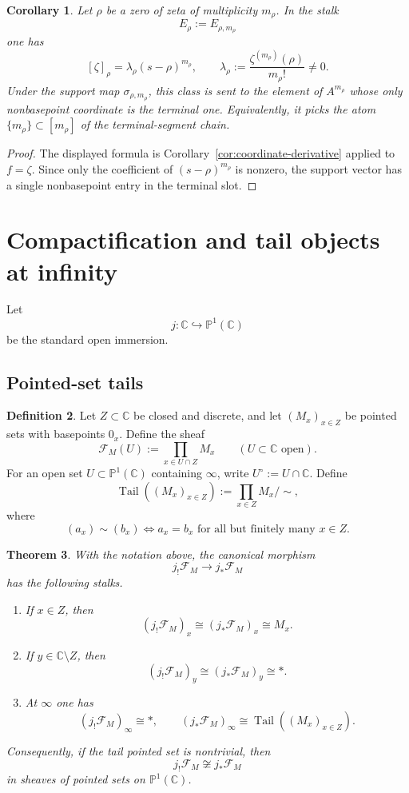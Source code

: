 \documentclass[11pt,a4paper]{article}
\newtheorem{theorem}{Theorem}[section]
\newtheorem{corollary}[theorem]{Corollary}
\theoremstyle{definition}
\newtheorem{definition}[theorem]{Definition}
\theoremstyle{remark}
\DeclareMathOperator{\Tail}{Tail}
\newcommand{\CC}{\mathbb C}
\newcommand{\PP}{\mathbb P}
\newcommand{\into}{\hookrightarrow}
\begin{document}
\begin{corollary}\label{cor:zeta-support-slot}
Let $\rho$ be a zero of zeta of multiplicity $m_\rho$.  In the stalk
\[
E_\rho:=E_{\rho,m_\rho}
\]
one has
\[
[\zeta]_\rho=\lambda_\rho (s-\rho)^{m_\rho},
\qquad
\lambda_\rho:=\frac{\zeta^{(m_\rho)}(\rho)}{m_\rho!}\neq0.
\]
Under the support map $\sigma_{\rho,m_\rho}$, this class is sent to the element of $A^{m_\rho}$ whose only nonbasepoint coordinate is the terminal one.  Equivalently, it picks the atom $\{m_\rho\}\subset [m_\rho]$ of the terminal-segment chain.
\end{corollary}

\begin{proof}
The displayed formula is Corollary~\ref{cor:coordinate-derivative} applied to $f=\zeta$.  Since only the coefficient of $(s-\rho)^{m_\rho}$ is nonzero, the support vector has a single nonbasepoint entry in the terminal slot.
\end{proof}

\section{Compactification and tail objects at infinity}

Let
\[
j:\CC\into\PP^1(\CC)
\]
be the standard open immersion.

\subsection{Pointed-set tails}

\begin{definition}
Let $Z\subset\CC$ be closed and discrete, and let $(M_x)_{x\in Z}$ be pointed sets with basepoints $0_x$.  Define the sheaf
\[
\mathcal F_M(U):=\prod_{x\in U\cap Z}M_x
\qquad (U\subset\CC\text{ open}).
\]
For an open set $U\subset\PP^1(\CC)$ containing $\infty$, write $U^\circ:=U\cap\CC$.  Define
\[
\Tail((M_x)_{x\in Z}):=\prod_{x\in Z}M_x\Big/\sim,
\]
where
\[
(a_x)\sim(b_x)\iff a_x=b_x\text{ for all but finitely many }x\in Z.
\]
\end{definition}

\begin{theorem}\label{thm:stalks-at-infty}
With the notation above, the canonical morphism
\[
j_!\mathcal F_M\longrightarrow j_*\mathcal F_M
\]
has the following stalks.
\begin{enumerate}[label=(\roman*)]
\item If $x\in Z$, then
\[
(j_!\mathcal F_M)_x\cong (j_*\mathcal F_M)_x\cong M_x.
\]
\item If $y\in\CC\setminus Z$, then
\[
(j_!\mathcal F_M)_y\cong (j_*\mathcal F_M)_y\cong *.
\]
\item At $\infty$ one has
\[
(j_!\mathcal F_M)_\infty\cong *,
\qquad
(j_*\mathcal F_M)_\infty\cong \Tail((M_x)_{x\in Z}).
\]
\end{enumerate}
Consequently, if the tail pointed set is nontrivial, then
\[
j_!\mathcal F_M\not\cong j_*\mathcal F_M
\]
in sheaves of pointed sets on $\PP^1(\CC)$.
\end{theorem}
\end{document}
